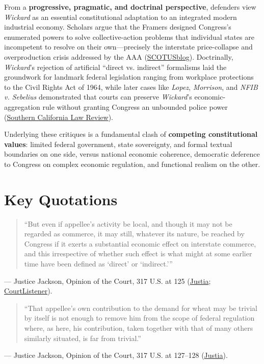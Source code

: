 \documentclass[12pt]{article}
\begin{document}
From a \textbf{progressive, pragmatic, and doctrinal perspective}, defenders view \textit{Wickard} as an essential constitutional adaptation to an integrated modern industrial economy. Scholars argue that the Framers designed Congress's enumerated powers to solve collective-action problems that individual states are incompetent to resolve on their own---precisely the interstate price-collapse and overproduction crisis addressed by the AAA (\href{https://www.scotusblog.com/2011/08/responding-to-the-eleventh-circuit-and-to-richard-epstein/}{SCOTUSblog}). Doctrinally, \textit{Wickard}'s rejection of artificial ``direct vs. indirect'' formalisms laid the groundwork for landmark federal legislation ranging from workplace protections to the Civil Rights Act of 1964, while later cases like \textit{Lopez}, \textit{Morrison}, and \textit{NFIB v. Sebelius} demonstrated that courts can preserve \textit{Wickard}'s economic-aggregation rule without granting Congress an unbounded police power (\href{https://southerncalifornialawreview.com/2019/12/08/the-limits-of-the-interstate-commerce-power-how-to-decide-the-close-cases-postscript-by-r-george-wright/}{Southern California Law Review}).

Underlying these critiques is a fundamental clash of \textbf{competing constitutional values}: limited federal government, state sovereignty, and formal textual boundaries on one side, versus national economic coherence, democratic deference to Congress on complex economic regulation, and functional realism on the other.

\section{Key Quotations}

\begin{quote}
``But even if appellee's activity be local, and though it may not be regarded as commerce, it may still, whatever its nature, be reached by Congress if it exerts a substantial economic effect on interstate commerce, and this irrespective of whether such effect is what might at some earlier time have been defined as `direct' or `indirect.'''
\end{quote}
\noindent --- Justice Jackson, Opinion of the Court, 317 U.S. at 125 (\href{https://supreme.justia.com/cases/federal/us/317/111/}{Justia}; \href{https://www.courtlistener.com/opinion/103716/wickard-v-filburn/}{CourtListener}).

\begin{quote}
``That appellee's own contribution to the demand for wheat may be trivial by itself is not enough to remove him from the scope of federal regulation where, as here, his contribution, taken together with that of many others similarly situated, is far from trivial.''
\end{quote}
\noindent --- Justice Jackson, Opinion of the Court, 317 U.S. at 127--128 (\href{https://supreme.justia.com/cases/federal/us/317/111/}{Justia}).
\end{document}
